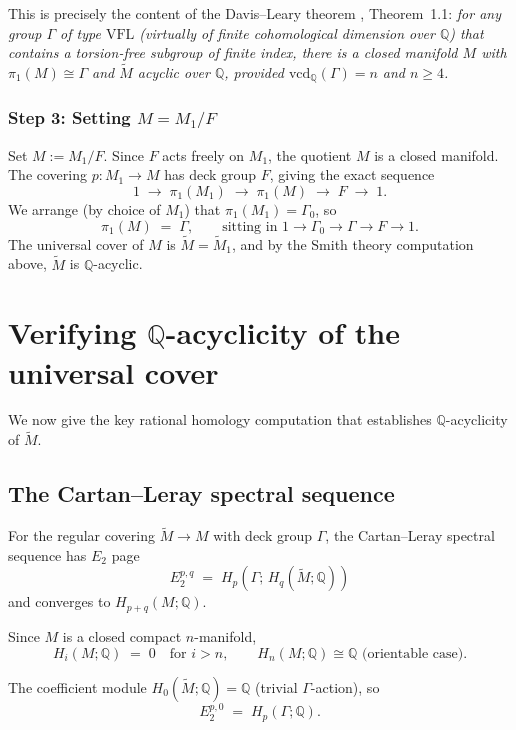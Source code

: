 \documentclass[12pt]{article}
\newcommand{\Q}{\mathbb{Q}}
\newcommand{\vcd}{\mathrm{vcd}}
\newcommand{\tilM}{\widetilde{M}}
\begin{document}
This is precisely the content of the Davis--Leary theorem \cite{DavisLeary2003}, Theorem~1.1:
\emph{for any group $\Gamma$ of type $\mathrm{VFL}$ (virtually of finite cohomological dimension
over $\Q$) that contains a torsion-free subgroup of finite index, there is a closed manifold
$M$ with $\pi_1(M) \cong \Gamma$ and $\tilM$ acyclic over $\Q$, provided $\vcd_\Q(\Gamma) = n$
and $n \geq 4$.}

\subsubsection*{Step 3: Setting $M = M_1/F$}

Set $M := M_1/F$.  Since $F$ acts freely on $M_1$, the quotient $M$ is a closed manifold.  The
covering $p: M_1 \to M$ has deck group $F$, giving the exact sequence
\[
  1 \;\to\; \pi_1(M_1) \;\to\; \pi_1(M) \;\to\; F \;\to\; 1.
\]
We arrange (by choice of $M_1$) that $\pi_1(M_1) = \Gamma_0$, so
\[
  \pi_1(M) \;=\; \Gamma, \qquad \text{sitting in } 1 \to \Gamma_0 \to \Gamma \to F \to 1.
\]
The universal cover of $M$ is $\tilM = \tilM_1$, and by the Smith theory computation above,
$\tilM$ is $\Q$-acyclic.

\section{Verifying $\Q$-acyclicity of the universal cover}
\label{sec:acyclic}

We now give the key rational homology computation that establishes $\Q$-acyclicity of $\tilM$.

\subsection{The Cartan--Leray spectral sequence}

For the regular covering $\tilM \to M$ with deck group $\Gamma$, the Cartan--Leray spectral
sequence has $E_2$ page
\[
  E_2^{p,q} \;=\; H_p(\Gamma;\, H_q(\tilM;\Q))
\]
and converges to $H_{p+q}(M;\Q)$.

Since $M$ is a closed compact $n$-manifold,
\[
  H_i(M;\Q) \;=\; 0 \quad \text{for } i > n, \qquad H_n(M;\Q) \cong \Q \text{ (orientable case)}.
\]

The coefficient module $H_0(\tilM;\Q) = \Q$ (trivial $\Gamma$-action), so
\[
  E_2^{p,0} \;=\; H_p(\Gamma;\Q).
\]
\end{document}
